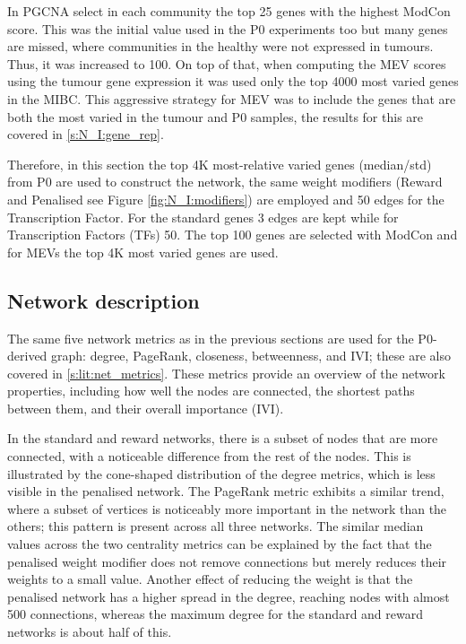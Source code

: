 
In PGCNA \citet{Care2019-ij} select in each community the top 25 genes with the highest ModCon score. This was the initial value used in the P0 experiments too but many genes are missed, where communities in the healthy were not expressed in tumours. Thus, it was increased to 100. On top of that, when computing the MEV scores using the tumour gene expression it was used only the top 4000 most varied genes in the MIBC. This aggressive strategy for MEV was to include the genes that are both the most varied in the tumour and P0 samples, the results for this are covered in \cref{s:N_I:gene_rep}.

Therefore, in this section the top 4K most-relative varied genes (median/std) from P0 are used to construct the network, the same weight modifiers (Reward and Penalised see Figure \ref{fig:N_I:modifiers}) are employed and 50 edges for the Transcription Factor. For the standard genes 3 edges are kept while for Transcription Factors (TFs) 50. The top 100 genes are selected with ModCon and for MEVs the top 4K most varied genes are used.

\subsection{Network description} \label{s:N_I:p0_tum_description}

The same five network metrics as in the previous sections are used for the P0-derived graph: degree, PageRank, closeness, betweenness, and IVI; these are also covered in \cref{s:lit:net_metrics}. These metrics provide an overview of the network properties, including how well the nodes are connected, the shortest paths between them, and their overall importance (IVI).

In the standard and reward networks, there is a subset of nodes that are more connected, with a noticeable difference from the rest of the nodes. This is illustrated by the cone-shaped distribution of the degree metrics, which is less visible in the penalised network. The PageRank metric exhibits a similar trend, where a subset of vertices is noticeably more important in the network than the others; this pattern is present across all three networks. The similar median values across the two centrality metrics can be explained by the fact that the penalised weight modifier does not remove connections but merely reduces their weights to a small value. Another effect of reducing the weight is that the penalised network has a higher spread in the degree, reaching nodes with almost 500 connections, whereas the maximum degree for the standard and reward networks is about half of this.

